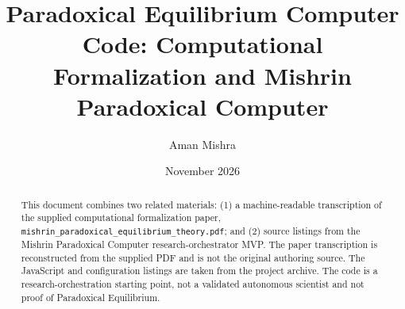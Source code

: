 \documentclass[10pt,a4paper]{article}
\title{Paradoxical Equilibrium Computer Code: Computational Formalization and Mishrin Paradoxical Computer}
\author{Aman Mishra}
\date{November 2026}
\begin{document}
\maketitle
\begin{abstract}
This document combines two related materials: (1) a machine-readable transcription of the supplied computational formalization paper, \texttt{mishrin\_paradoxical\_equilibrium\_theory.pdf}; and (2) source listings from the Mishrin Paradoxical Computer research-orchestrator MVP. The paper transcription is reconstructed from the supplied PDF and is not the original authoring source. The JavaScript and configuration listings are taken from the project archive. The code is a research-orchestration starting point, not a validated autonomous scientist and not proof of Paradoxical Equilibrium.
\end{abstract}
\tableofcontents
\clearpage
\end{document}
